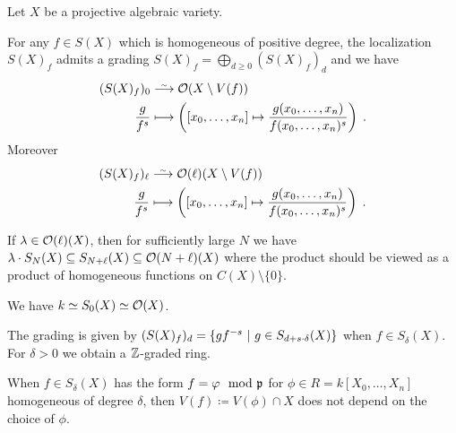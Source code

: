 \documentclass[a4paper,parskip=half,numbers=enddot, DIV=12]{scrreprt}
\begin{document}
\begin{thm}
    Let $X$ be a projective algebraic variety. 
    \begin{alphanumerate}    
      \item 
        For any $f\in S(X)$ which is homogeneous of positive degree, the localization $S(X)_f$ admits a grading $S(X)_f=\bigoplus_{d\geq 0}(S(X)_f)_d$  and we have
        \begin{align*}
            (S(X)_f)_0 &\isomorphism \Oo(X\setminus V(f))\\
            \frac{g}{f^s} &\longmapsto \left([x_0,\ldots,x_n] \mapsto \frac{g(x_0,\ldots,x_n)}{f(x_0,\ldots, x_n)^s}\right)\;.
        \end{align*}
        Moreover
        \begin{align*}
            (S(X)_f)_\ell &\isomorphism \Oo(\ell)(X\setminus V(f)) \\
            \frac{g}{f^s} &\longmapsto \left([x_0,\ldots,x_n] \mapsto \frac{g(x_0,\ldots,x_n)}{f(x_0,\ldots, x_n)^s}\right)\;.
        \end{align*}
      \item 
        If $\lambda\in\mathcal{O}(\ell)(X)$, then for sufficiently large $N$ we have $\lambda\cdot S_N(X)\subseteq S_{N+\ell}(X)\subseteq \mathcal{O}(N+\ell)(X)$ where the product should be viewed as a product of homogeneous functions on $C(X)\setminus \{0\}$.
      \item 
         We have $k\simeq S_0(X)\simeq\mathcal{O}(X)$.
    \end{alphanumerate}
\end{thm}
\begin{rem*}
    \begin{alphanumerate}
        \item 
            The grading is given by $(S(X)_f)_d =\left\{gf^{-s}\ \middle|\  g\in S_{d+s\cdot \delta}(X)\right\}$ when $f\in S_\delta(X)$. For $\delta>0$ we obtain a $\mathbb{Z}$-graded ring.
        \item 
            When $f\in S_\delta(X)$ has the form $f=\varphi \mod {\mathfrak{p}}$ for $\phi \in R = k[X_0,\ldots, X_n]$ homogeneous of degree $\delta$, then $V(f)\coloneqq V(\phi)\cap X$ does not depend on the choice of $\phi$.
    \end{alphanumerate}
\end{rem*}
\end{document}
